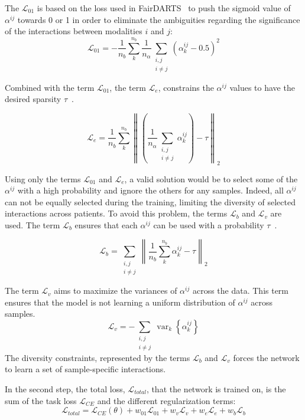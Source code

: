 \documentclass[../main.tex]{subfiles}
\begin{document}
     The \(\mathcal{L}_{01}\) is based on the loss used in FairDARTS~\cite{FairDARTS} to push the sigmoid value of \(\alpha^{ij}\) towards 0 or 1 in order to eliminate the ambiguities regarding the significance of the interactions between modalities \(i\) and \(j\):
     \[ \mathcal{L}_{01} = - \frac{1}{n_{b}}\sum_{k}^{n_b}\frac{1}{n_{\alpha}}\sum_{\substack{i,j \\ i \neq j}} \left( \alpha_k^{ij} - 0.5 \right)^2 \]

     Combined with the term \(\mathcal{L}_{01}\), the term \(\mathcal{L}_{e}\), constrains the \(\alpha^{ij}\) values to have the desired sparsity \(\tau\)~\cite{Bengio2015ConditionalCI}.

     \[ \mathcal{L}_{e} = \frac{1}{n_b} \sum_{k}^{n_b} \left\| \left(\frac{1}{n_{\alpha}}\sum_{\substack{i,j \\ i \neq j}} \alpha^{ij}_{k}\right) - \tau \right\|_2\]

     Using only the terms \(\mathcal{L}_{01}\) and \(\mathcal{L}_{e}\), a valid solution would be to select some of the \(\alpha^{ij}\) with a high probability and ignore the others for any samples.
     Indeed, all \(\alpha^{ij}\) can not be equally selected during the training, limiting the diversity of selected interactions across patients.
     To avoid this problem, the terms \(\mathcal{L}_{b}\) and \(\mathcal{L}_{v}\) are used.
     The term \(\mathcal{L}_{b}\) ensures that each \(\alpha^{ij}\) can be used with a probability \(\tau\)~\cite{Bengio2015ConditionalCI}.

     \[ \mathcal{L}_{b} = \sum_{\substack{i,j \\ i \neq j}} \left\|\frac{1}{n_b}\sum_{k}^{n_b}\alpha^{ij}_k - \tau \right\|_2\]

     The term \(\mathcal{L}_{v}\) aims to maximize the variances of \(\alpha^{ij}\) across the data.
     This term ensures that the model is not learning a uniform distribution of \(\alpha^{ij}\) across samples.
     \[ \mathcal{L}_{v} = - \sum_{\substack{i,j \\ i \neq j}} \operatorname{var}_k\left\{\alpha^{ij}_{k} \right\}\]
     The diversity constraints, represented by the terms \(\mathcal{L}_{b}\) and \(\mathcal{L}_{v}\) forces the network to learn a set of sample-specific interactions.

     In the second step, the total loss, \(\mathcal{L}_{total}\), that the network is trained on, is the sum of the task loss \(\mathcal{L}_{CE}\) and the different regularization terms:
     \[ \mathcal{L}_{total} = \mathcal{L}_{CE}\left(\theta\right) + w_{01}\mathcal{L}_{01} + w_{v}\mathcal{L}_{v} + w_{e}\mathcal{L}_{e} + w_{b}\mathcal{L}_{b}\]
\end{document}
